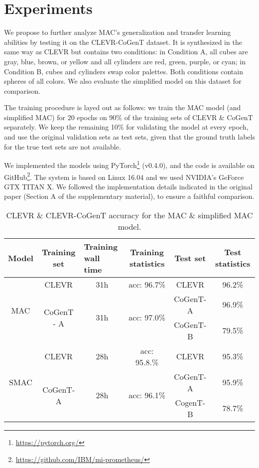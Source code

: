 \section{Experiments}

We propose to further analyze MAC's generalization and transfer learning abilities by testing it on the CLEVR-CoGenT dataset. It is synthesized in the same way as CLEVR but contains two conditions: in Condition A, all cubes are gray, blue, brown, or yellow and all cylinders are red, green, purple, or cyan; in Condition B, cubes and cylinders swap color palettes. Both conditions contain spheres of all colors. We also evaluate the simplified model on this dataset for comparison.

The training procedure is layed out as follows: we train the MAC model (and simplified MAC) for 20 epochs on 90\% of the training sets of CLEVR \& CoGenT separately. We keep the remaining 10\% for validating the model at every epoch, and use the original validation sets as test sets, given that the ground truth labels for the true test sets are not available.

We implemented the models using PyTorch\footnote{\url{https://pytorch.org/}} (v0.4.0), and the code is available on GitHub\footnote{\url{https://github.com/IBM/mi-prometheus/}}. The system is based on Linux 16.04 and we used NVIDIA's GeForce GTX TITAN X. We followed the implementation details indicated in the original paper (Section A of the supplementary material), to ensure a faithful comparison.

\begin{table}[]
	\centering
	\begin{tabular}{|c|c|c|c|c|c|}
		\hline
		Model                 & Training set                & \multicolumn{1}{l|}{Training wall time} & Training statistics          & Test set & Test statistics \\ \hline
		\multirow{3}{*}{MAC}  & CLEVR                       & 31h                                     & acc: 96.7\%                  & CLEVR    & 96.2\%          \\ \cline{2-6} 
		& \multirow{2}{*}{CoGenT - A} & \multirow{2}{*}{31h}                    & \multirow{2}{*}{acc: 97.0\%} & CoGenT-A & 96.9\%          \\ \cline{5-6} 
		&                             &                                         &                              & CoGenT-B & 79.5\%          \\ \hline
		\multirow{3}{*}{SMAC} & CLEVR                       & 28h                                     & acc: 95.8.\%                 & CLEVR    & 95.3\%          \\ \cline{2-6} 
		& \multirow{2}{*}{CoGenT-A}   & \multirow{2}{*}{28h}                    & \multirow{2}{*}{acc: 96.1\%} & CoGenT-A & 95.9\%          \\ \cline{5-6} 
		&                             &                                         &                              & CogenT-B & 78.7\%          \\ \hline
	\end{tabular}
	\caption{CLEVR \& CLEVR-CoGenT accuracy for the MAC \& simplified MAC model.}
	\label{results}
\end{table}

